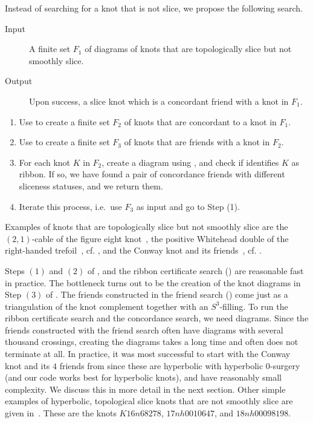 \documentclass{amsart} %
\theoremstyle{thm}
\theoremstyle{definition}
\numberwithin{equation}{section}
\begin{document}
Instead of searching for a knot that is not slice, we propose the following search.

\begin{algorithm}
\caption{Search for a pair of knots that are concordance friends but have different sliceness statuses.}
\label{algo:conc_friends}
\begin{description}
    \item[Input] A finite set $F_1$ of diagrams of knots that are topologically slice but not smoothly slice.
    \item[Output] Upon success, a slice knot which is a concordant friend with a knot in $F_1$. 
\end{description}
   \begin{enumerate}
        \item Use  to create a finite set $F_2$ of knots that are concordant to a knot in $F_1$.
        \item Use  to create a finite set $F_3$ of knots that are friends with a knot in $F_2$.
        \item For each knot $K$ in $F_2$, create a diagram using \cite{Dunfield_exterior_to_link}, and check if  identifies $K$ as ribbon. If so, we have found a pair of concordance friends with different sliceness statuses, and we return them.
        \item Iterate this process, i.e.\ use $F_3$ as input and go to Step (1).
    \end{enumerate}
\end{algorithm}

Examples of knots that are topologically slice but not smoothly slice are the $(2,1)$-cable of the figure eight knot~\cite{cable_fig_8}, the positive Whitehead double of the right-handed trefoil~\cite{Hedden_Whitehead}, cf. , and the Conway knot and its friends~\cite{Piccirillo_Conway_knot}, cf. . 

Steps $(1)$ and $(2)$ of , and the ribbon certificate search () are reasonable fast in practice. The bottleneck turns out to be the creation of the knot diagrams in Step $(3)$ of . The friends constructed in the friend search () come just as a triangulation of the knot complement together with an $S^3$-filling. To run the ribbon certificate search and the concordance search, we need diagrams. Since the friends constructed with the friend search often have diagrams with several thousand crossings, creating the diagrams takes a long time and often does not terminate at all. In practice, it was most successful to start with the Conway knot and its $4$ friends from  since these are hyperbolic with hyperbolic $0$-surgery (and our code works best for hyperbolic knots), and have reasonably small complexity. We discuss this in more detail in the next section. Other simple examples of hyperbolic, topological slice knots that are not smoothly slice are given in~\cite{Dunfield_Gong}. These are the knots $K16n68278$, $17nh0010647$, and $18nh00098198$.
\end{document}
